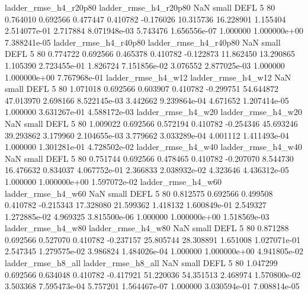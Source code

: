    ladder_rmse_h4_r20p80    ladder_rmse_h4_r20p80                   NaN      small     DEFL                 5 80 0.764010       0.692566 0.477447       0.410782   -0.176026     10.315736     16.228901     1.155404   2.514077e-01  2.717884 8.071948e-03     5.743476   1.656556e-07            1.000000    1.000000e+00        7.388241e-05
   ladder_rmse_h4_r40p80    ladder_rmse_h4_r40p80                   NaN      small     DEFL                 5 80 0.774722       0.692566 0.465378       0.410782   -0.122873     11.862450     13.290865     1.105390   2.723455e-01  1.826724 7.151856e-02     3.076552   2.877025e-03            1.000000    1.000000e+00        7.767968e-01
      ladder_rmse_h4_w12       ladder_rmse_h4_w12                   NaN      small     DEFL                 5 80 1.071018       0.692566 0.603907       0.410782   -0.299751     54.644872     47.013970     2.698166   8.522145e-03  3.442662 9.239864e-04     4.671652   1.207414e-05            1.000000    3.631267e-01        4.588172e-03
      ladder_rmse_h4_w20       ladder_rmse_h4_w20                   NaN      small     DEFL                 5 80 1.009022       0.692566 0.572194       0.410782   -0.254346     45.693246     39.293862     3.179960   2.104655e-03  3.779662 3.033289e-04     4.001112   1.411493e-04            1.000000    1.301281e-01        4.728502e-02
      ladder_rmse_h4_w40       ladder_rmse_h4_w40                   NaN      small     DEFL                 5 80 0.751744       0.692566 0.478465       0.410782   -0.207070      8.544730     16.476632     0.834037   4.067752e-01  2.366833 2.038932e-02     4.323646   4.436312e-05            1.000000    1.000000e+00        1.597072e-02
      ladder_rmse_h4_w60       ladder_rmse_h4_w60                   NaN      small     DEFL                 5 80 0.812575       0.692566 0.499508       0.410782   -0.215343     17.328080     21.599362     1.418132   1.600849e-01  2.549327 1.272885e-02     4.969325   3.815500e-06            1.000000    1.000000e+00        1.518569e-03
      ladder_rmse_h4_w80       ladder_rmse_h4_w80                   NaN      small     DEFL                 5 80 0.871288       0.692566 0.527070       0.410782   -0.237157     25.805744     28.308891     1.651008   1.027071e-01  2.547345 1.279575e-02     3.986824   1.484026e-04            1.000000    1.000000e+00        4.941805e-02
      ladder_rmse_h8_all       ladder_rmse_h8_all                   NaN      small     DEFL                 5 80 1.047299       0.692566 0.634048       0.410782   -0.417921     51.220036     54.351513     2.468974   1.570800e-02  3.503368 7.595473e-04     5.757201   1.564467e-07            1.000000    3.030594e-01        7.008814e-05
